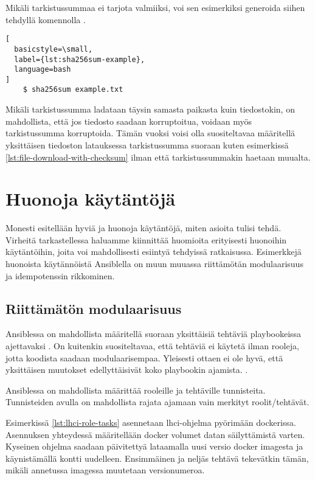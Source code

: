 

Mikäli tarkistussummaa ei tarjota valmiiksi, voi sen esimerkiksi generoida siihen tehdyllä
komennolla \parencite{Sha256sumManPage}.

\begin{lstlisting}[
  basicstyle=\small,
  label={lst:sha256sum-example},
  language=bash
]
    $ sha256sum example.txt
\end{lstlisting}

Mikäli tarkistussumma ladataan täysin samasta paikasta kuin tiedostokin, on mahdollista, että
jos tiedosto saadaan korruptoitua, voidaan myös tarkistussumma korruptoida. Tämän vuoksi voisi
olla suositeltavaa määritellä yksittäisen tiedoston latauksessa tarkistussumma suoraan kuten
esimerkissä \ref{lst:file-download-with-checksum} ilman että tarkistussummakin haetaan muualta.

\section{Huonoja käytäntöjä}

Monesti esitellään hyviä ja huonoja käytäntöjä, miten asioita tulisi tehdä. Virheitä
tarkastellessa haluamme kiinnittää huomioita erityisesti huonoihin käytäntöihin, joita
voi mahdollisesti esiintyä tehdyissä ratkaisussa. Esimerkkejä huonoista käytännöistä
Ansiblella on muun muuassa riittämötän modulaarisuus ja idempotenssin rikkominen.

\subsection{Riittämätön modulaarisuus}

Ansiblessa on mahdollista määritellä suoraan yksittäisiä tehtäviä playbookeissa ajettavaksi
\parencite{AnsibleDocs}. On kuitenkin suositeltavaa, että tehtäviä ei käytetä ilman rooleja,
jotta koodista saadaan modulaarisempaa. Yleisesti ottaen ei ole hyvä, että yksittäisen
muutokset edellyttäisivät koko playbookin ajamista. \parencite{KumaraIndika2021Tdad}.

Ansiblessa on mahdollista määrittää rooleille ja tehtäville tunnisteita. Tunnisteiden
avulla on mahdollista rajata ajamaan vain merkityt roolit/tehtävät. \parencite{AnsibleDocs}

Esimerkissä \ref{lst:lhci-role-tasks} asennetaan lhci-ohjelma pyörimään dockerissa. Asennuksen
yhteydessä määritellään docker volumet datan säilyttämistä varten. Kyseinen ohjelma saadaan
päivitettyä lataamalla uusi versio docker imagesta ja käynistämällä kontti uudelleen.
Ensimmäinen ja neljäs tehtävä tekevätkin tämän, mikäli annetussa imagessa muutetaan
versionumeroa.

